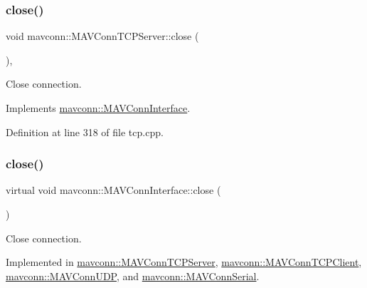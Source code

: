 \mbox{\label{group__mavconn_ga11e23cc16d8a8637583fbecc7bbe915b}} 
\subsubsection{\texorpdfstring{close()}{close()}\hspace{0.1cm}{\footnotesize\ttfamily [4/5]}}
{\footnotesize\ttfamily void mavconn\+::\+M\+A\+V\+Conn\+T\+C\+P\+Server\+::close (\begin{DoxyParamCaption}{ }\end{DoxyParamCaption})\hspace{0.3cm}{\ttfamily [override]}, {\ttfamily [virtual]}}



Close connection. 



Implements \mbox{\hyperlink{group__mavconn_ga7c1a5a89489e345a6621c327107293d8}{mavconn\+::\+M\+A\+V\+Conn\+Interface}}.



Definition at line 318 of file tcp.\+cpp.

\mbox{\label{group__mavconn_ga7c1a5a89489e345a6621c327107293d8}} 
\subsubsection{\texorpdfstring{close()}{close()}\hspace{0.1cm}{\footnotesize\ttfamily [5/5]}}
{\footnotesize\ttfamily virtual void mavconn\+::\+M\+A\+V\+Conn\+Interface\+::close (\begin{DoxyParamCaption}{ }\end{DoxyParamCaption})\hspace{0.3cm}{\ttfamily [pure virtual]}}



Close connection. 



Implemented in \mbox{\hyperlink{group__mavconn_ga11e23cc16d8a8637583fbecc7bbe915b}{mavconn\+::\+M\+A\+V\+Conn\+T\+C\+P\+Server}}, \mbox{\hyperlink{group__mavconn_ga3128ab3303f5a303be12c2c9df1ee321}{mavconn\+::\+M\+A\+V\+Conn\+T\+C\+P\+Client}}, \mbox{\hyperlink{group__mavconn_ga78a057400db4bf2240b00e29d4251dfe}{mavconn\+::\+M\+A\+V\+Conn\+U\+DP}}, and \mbox{\hyperlink{group__mavconn_gabacc69adc5d2d2f9cb3aa27907d83d5c}{mavconn\+::\+M\+A\+V\+Conn\+Serial}}.

